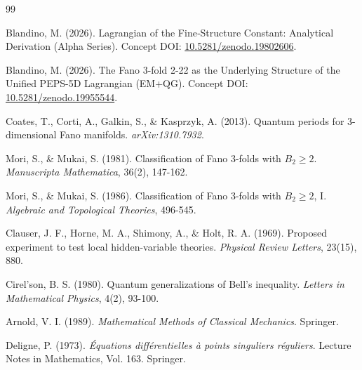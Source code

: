 \documentclass[12pt]{article}
\begin{document}

\begin{thebibliography}{99}

Blandino, M. (2026). Lagrangian of the Fine‑Structure Constant: Analytical Derivation (Alpha Series). Concept DOI: \href{https://doi.org/10.5281/zenodo.19802606}{10.5281/zenodo.19802606}.

Blandino, M. (2026). The Fano 3-fold 2-22 as the Underlying Structure of the Unified PEPS-5D Lagrangian (EM+QG). Concept DOI: \href{https://doi.org/10.5281/zenodo.19955544}{10.5281/zenodo.19955544}.

Coates, T., Corti, A., Galkin, S., \& Kasprzyk, A. (2013). Quantum periods for 3-dimensional Fano manifolds. \textit{arXiv:1310.7932}.

Mori, S., \& Mukai, S. (1981). Classification of Fano 3-folds with $B_2 \ge 2$. \textit{Manuscripta Mathematica}, 36(2), 147-162.

Mori, S., \& Mukai, S. (1986). Classification of Fano 3-folds with $B_2 \ge 2$, I. \textit{Algebraic and Topological Theories}, 496-545.

Clauser, J. F., Horne, M. A., Shimony, A., \& Holt, R. A. (1969). Proposed experiment to test local hidden-variable theories. \textit{Physical Review Letters}, 23(15), 880.

Cirel'son, B. S. (1980). Quantum generalizations of Bell's inequality. \textit{Letters in Mathematical Physics}, 4(2), 93-100.

Arnold, V. I. (1989). \textit{Mathematical Methods of Classical Mechanics}. Springer.

Deligne, P. (1973). \textit{Équations différentielles à points singuliers réguliers}. Lecture Notes in Mathematics, Vol. 163. Springer.

\end{thebibliography}
\end{document}
